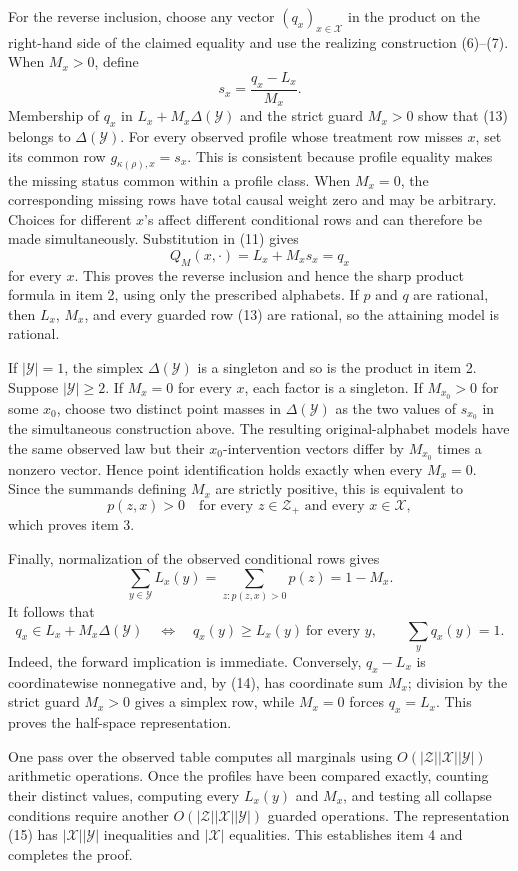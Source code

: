 For the reverse inclusion, choose any vector
\((q_x)_{x\in\mathcal X}\) in the product on the right-hand side of the
claimed equality and use the realizing construction (6)--(7).  When
\(M_x>0\), define
\[
 s_x=\frac{q_x-L_x}{M_x}.
\tag{13}
\]
Membership of \(q_x\) in \(L_x+M_x\Delta(\mathcal Y)\) and the strict
guard \(M_x>0\) show that (13) belongs to
\(\Delta(\mathcal Y)\).  For every observed profile whose treatment row
misses \(x\), set its common row
\(g_{\kappa(\rho),x}=s_x\).  This is consistent because profile equality
makes the missing status common within a profile class.  When \(M_x=0\),
the corresponding missing rows have total causal weight zero and may be
arbitrary.  Choices for different \(x\)'s affect different conditional
rows and can therefore be made simultaneously.  Substitution in (11)
gives
\[
 Q_M(x,\cdot)=L_x+M_xs_x=q_x
\]
for every \(x\).  This proves the reverse inclusion and hence the sharp
product formula in item 2, using only the prescribed alphabets.  If
\(p\) and \(q\) are rational, then \(L_x\), \(M_x\), and every guarded
row (13) are rational, so the attaining model is rational.

If \(|\mathcal Y|=1\), the simplex \(\Delta(\mathcal Y)\) is a
singleton and so is the product in item 2.  Suppose
\(|\mathcal Y|\geq2\).  If \(M_x=0\) for every \(x\), each factor is a
singleton.  If \(M_{x_0}>0\) for some \(x_0\), choose two distinct point
masses in \(\Delta(\mathcal Y)\) as the two values of \(s_{x_0}\) in
the simultaneous construction above.  The resulting original-alphabet
models have the same observed law but their \(x_0\)-intervention vectors
differ by \(M_{x_0}\) times a nonzero vector.  Hence point identification
holds exactly when every \(M_x=0\).  Since the summands defining \(M_x\)
are strictly positive, this is equivalent to
\[
 p(z,x)>0\quad\text{for every }z\in\mathcal Z_+
 \text{ and every }x\in\mathcal X,
\]
which proves item 3.

Finally, normalization of the observed conditional rows gives
\[
 \sum_{y\in\mathcal Y}L_x(y)
 =\sum_{z:p(z,x)>0}p(z)=1-M_x.
\tag{14}
\]
It follows that
\[
 q_x\in L_x+M_x\Delta(\mathcal Y)
 \quad\Longleftrightarrow\quad
 q_x(y)\geq L_x(y)\ \text{for every }y,
 \qquad \sum_yq_x(y)=1.
\tag{15}
\]
Indeed, the forward implication is immediate.  Conversely,
\(q_x-L_x\) is coordinatewise nonnegative and, by (14), has coordinate
sum \(M_x\); division by the strict guard \(M_x>0\) gives a simplex row,
while \(M_x=0\) forces \(q_x=L_x\).  This proves the half-space
representation.

One pass over the observed table computes all marginals using
\(O(|\mathcal Z||\mathcal X||\mathcal Y|)\) arithmetic operations.
Once the profiles have been compared exactly, counting their distinct
values, computing every \(L_x(y)\) and \(M_x\), and testing all collapse
conditions require another
\(O(|\mathcal Z||\mathcal X||\mathcal Y|)\) guarded operations.  The
representation (15) has \(|\mathcal X||\mathcal Y|\) inequalities and
\(|\mathcal X|\) equalities.  This establishes item 4 and completes the
proof.